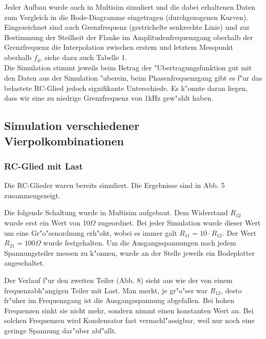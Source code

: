 \documentclass[10pt]{article}
\begin{document}
Jeder Aufbau wurde auch in Multisim simuliert und die dabei erhaltenen Daten zum Vergleich in die Bode-Diagramme eingetragen (durchgezogenen Kurven). Eingezeichnet sind auch Grenzfrequenz (gestrichelte senkrechte Linie) und zur Bestimmung der Steilheit der Flanke im Amplitudenfrequenzgang oberhalb der Grenzfrequenz die Interpolation zwischen erstem und letztem Messpunkt oberhalb $f_g$, siehe dazu auch Tabelle 1.\\ %

Die Simulation stimmt jeweils beim Betrag der "Ubertragungsfunktion gut mit den Daten aus der Simulation "uberein, beim Phasenfrequenzgang gibt es f"ur das belastete RC-Glied jedoch signifikante Unterschiede. Es k"onnte daran liegen, dass wir eine zu niedrige Grenzfrequenz von 1kHz gew"ahlt haben.




%
\newpage
\subsection{Simulation verschiedener Vierpolkombinationen}
\subsubsection{RC-Glied mit Last}
Die RC-Glieder waren bereits simuliert. Die Ergebnisse sind in Abb. 5 zusammengezeigt.



Die folgende Schaltung wurde in Multisim aufgebaut. Dem Widerstand $R_{12}$ wurde erst ein Wert von 10$\Omega$ zugeordnet. Bei jeder Simulation wurde dieser Wert um eine Gr"o"senordnung erh"oht, wobei es immer galt $R_{11}=10 \cdot R_{12}$. Der Wert $R_{21} = 100\Omega$ wurde festgehalten. Um die Ausgangsspannungen nach jedem Spannungsteiler messen zu k"onnen, wurde an der Stelle jeweils ein Bodeplotter angeschaltet.

Der Verlauf f"ur den zweiten Teiler (Abb. 8) sieht aus wie der von einem frequenzabh"angigen Teiler mit Last. Man merkt, je gr"o"ser war $R_{12}$, desto fr"uher im Frequenzgang ist die Ausgangsspannung abgefallen. Bei hohen Frequenzen sinkt sie nicht mehr, sondern nimmt einen konstanten Wert an. Bei solchen Frequenzen wird Kondensator fast vernachl"assigbar, weil nur noch eine geringe Spannung dar"uber abf"allt. 
\end{document}
